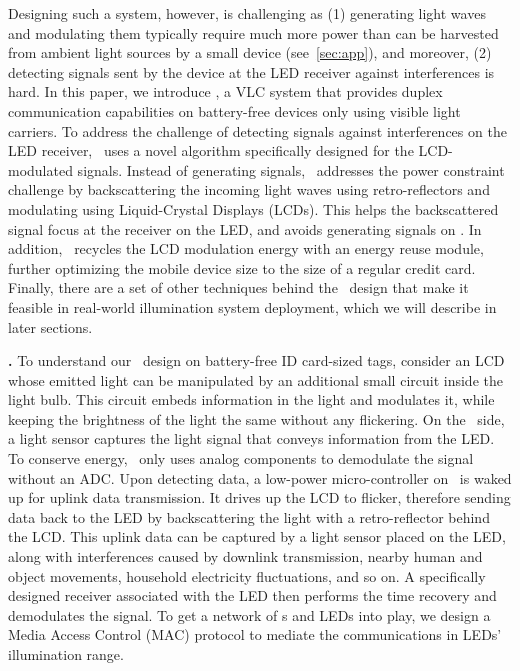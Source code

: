 Designing such a system, however, is challenging as (1) generating light waves and modulating them typically require much more power than can be harvested from ambient light sources by a small device (see~\ref{sec:app}), and moreover, (2) detecting signals sent by the device at the LED receiver against interferences is hard. In this paper, we introduce \vitag, a VLC system that provides duplex communication capabilities on battery-free devices only using visible light carriers. To address the challenge of detecting signals against interferences on the LED receiver, \vitag\ uses a novel algorithm specifically designed for the LCD-modulated signals. Instead of generating signals, \vitag\ addresses the power constraint challenge by backscattering the incoming light waves using retro-reflectors and modulating using Liquid-Crystal Displays (LCDs). This helps the backscattered signal focus at the receiver on the LED, and avoids generating signals on \vitag. In addition, \vitag\ recycles the LCD modulation energy with an energy reuse module, further optimizing the mobile device size to the size of a regular credit card. Finally, there are a set of other techniques behind the \vitag\ design that make it feasible in real-world illumination system deployment, which we will describe in later sections.

\textbf{\vitag.} To understand our \vitag\ design on battery-free ID card-sized tags, consider an LCD whose emitted light can be manipulated by an additional small circuit inside the light bulb. This circuit embeds information in the light and modulates it, while keeping the brightness of the light the same without any flickering. On the \vitag\ side, a light sensor captures the light signal that conveys information from the LED. To conserve energy, \vitag\ only uses analog components to demodulate the signal without an ADC. Upon detecting data, a low-power micro-controller on \vitag\ is waked up for uplink data transmission. It drives up the LCD to flicker, therefore sending data back to the LED by backscattering the light with a retro-reflector behind the LCD. This uplink data can be captured by a light sensor placed on the LED, along with interferences caused by downlink transmission, nearby human and object movements, household electricity fluctuations, and so on. A specifically designed receiver associated with the LED then performs the time recovery and demodulates the signal. To get a network of \vitag\/s and LEDs into play, we design a Media Access Control (MAC) protocol to mediate the communications in LEDs' illumination range. 

